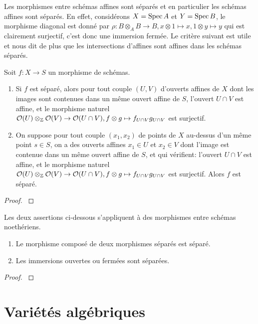 Les morphismes entre schémas affines sont séparés et en particulier les schémas affines sont séparés. En effet, considérons $X=\operatorname{Spec} A$ et $Y=\operatorname{Spec} B$, le morphisme diagonal est donné par $\rho: B\otimes_A B\rightarrow B, x\otimes 1\mapsto x, 1\otimes y \mapsto y$ qui est clairement surjectif, c'est donc une immersion fermée. Le critère suivant est utile et nous dit de plus que les intersections d'affines sont affines dans les schémas séparés.

\begin{prop}\label{sepCritere}
Soit $f:X\rightarrow S$ un morphisme de schémas.
	\begin{enumerate}
	\item Si $f$ est séparé, alors pour tout couple $(U,V)$ d'ouverts affines de $X$ dont les images sont contenues dans un même ouvert affine de $S$, l'ouvert $U\cap V$ est affine, et le morphisme naturel $\mathcal{O}(U)\otimes_{\mathbb{Z}} \mathcal{O}(V)\rightarrow\mathcal{O}(U\cap V), f\otimes g\mapsto f_{U\cap V}g_{U\cap V}$ est surjectif.
	\item On suppose pour tout couple $(x_1,x_2)$ de points de $X$ au-dessus d'un même point $s\in S$, on a des ouverts affines $x_1\in U$ et $x_2\in V$ dont l'image est contenue dans un même ouvert affine de $S$, et qui vérifient: l'ouvert $U\cap V$ est affine, et le morphisme naturel $\mathcal{O}(U)\otimes_{\mathbb{Z}} \mathcal{O}(V)\rightarrow\mathcal{O}(U\cap V), f\otimes g\mapsto f_{U\cap V}g_{U\cap V}$ est surjectif. Alors $f$ est séparé.
	\end{enumerate}
\end{prop}
\begin{proof}
\cite[\href{http://stacks.math.columbia.edu/tag/01KP}{Lemma 01KP}]{stacks-project}
\end{proof}

\begin{prop}\label{sepCritere2}
Les deux assertions ci-dessous s'appliquent à des morphismes entre schémas noethériens.
\begin{enumerate}
	\item Le morphisme composé de deux morphismes séparés est séparé.
	\item Les immersions ouvertes ou fermées sont séparées.
	\end{enumerate}
\end{prop}
\begin{proof}
\cite[II.4.6]{Hartshorne} 
\end{proof}

\section{Variétés algébriques}

